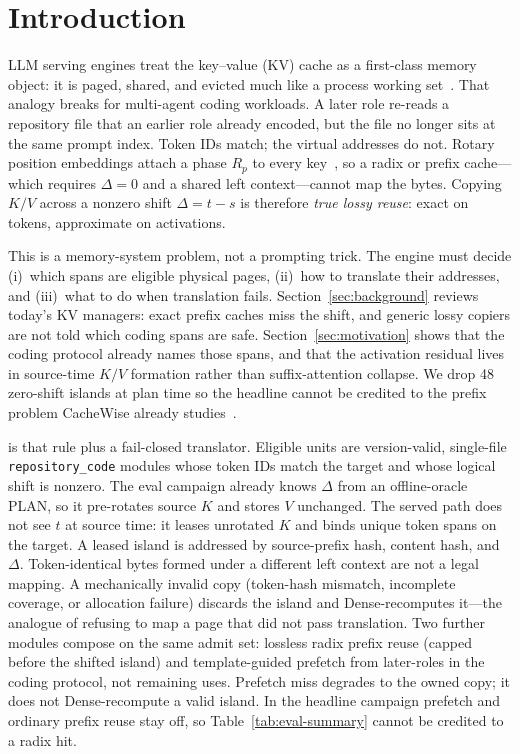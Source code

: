 \section{Introduction}
\label{sec:introduction}

LLM serving engines treat the key--value (KV) cache as a first-class
memory object: it is paged, shared, and evicted much like a
process working set~\cite{kwon2023efficient,sglang2024}. That analogy
breaks for multi-agent coding workloads. A later role re-reads a
repository file that an earlier role already encoded, but the file no
longer sits at the same prompt index. Token IDs match; the virtual
addresses do not. Rotary position embeddings attach a phase $R_p$ to
every key~\cite{su2021roformer}, so a radix or prefix cache---which
requires $\Delta = 0$ and a shared left context---cannot map the
bytes. Copying $K/V$ across a nonzero shift $\Delta = t - s$ is
therefore \emph{true lossy reuse}: exact on tokens, approximate on
activations.

This is a memory-system problem, not a prompting trick. The engine
must decide (i)~which spans are eligible physical pages, (ii)~how to
translate their addresses, and (iii)~what to do when translation
fails. Section~\ref{sec:background} reviews today's KV managers:
exact prefix caches miss the shift, and generic lossy copiers are not
told which coding spans are safe. Section~\ref{sec:motivation} shows
that the coding protocol already names those spans, and that the
activation residual lives in source-time $K/V$ formation rather than
suffix-attention collapse. We drop 48 zero-shift islands at plan time
so the headline cannot be credited to the prefix problem CacheWise
already studies~\cite{tiwari2026cachewise}.

\method{} is that rule plus a fail-closed translator. Eligible units
are version-valid, single-file \texttt{repository\_code} modules whose
token IDs match the target and whose logical shift is nonzero.
The eval campaign already knows $\Delta$ from an offline-oracle PLAN,
so it pre-rotates source $K$ and stores $V$ unchanged. The served path
does not see $t$ at source time: it leases unrotated $K$ and binds
unique token spans on the target. A leased island is addressed by
source-prefix hash, content hash, and $\Delta$. Token-identical bytes
formed under a different left context are not a legal mapping. A mechanically invalid copy
(token-hash mismatch, incomplete coverage, or allocation failure)
discards the island and Dense-recomputes it---the analogue of refusing
to map a page that did not pass translation. Two further modules compose
on the same admit set: lossless radix prefix reuse (capped before the
shifted island) and template-guided prefetch from later-roles in the
coding protocol, not remaining uses. Prefetch miss degrades to the
owned copy; it does not Dense-recompute a valid island. In the headline
campaign prefetch and ordinary prefix reuse stay off, so
Table~\ref{tab:eval-summary} cannot be credited to a radix hit.

